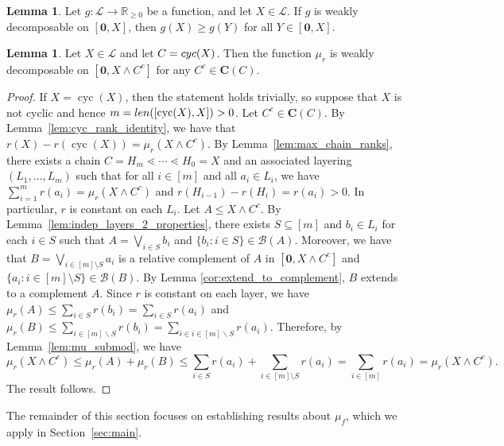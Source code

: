 \documentclass[a4paper,11pt,reqno]{article}
\theoremstyle{definition}
\newtheorem{lemma}[theorem]{{{Lemma}}}
\newcommand{\len}{\textup{len}}
\newcommand{\zero}{{\mathbf{0}}}
\DeclareMathOperator{\cyc}{cyc}
\begin{document}
\begin{lemma}\label{lem:qmBA}
    Let $g:\mathcal{L}\to\mathbb{R}_{\geq 0}$ be a function, and let $X \in \mathcal{L}$.  
    If $g$ is weakly decomposable on $[\zero,X]$, then $g(X) \geq g(Y)$ for all $Y \in [\zero,X]$.  
\end{lemma}

\begin{lemma}\label{lem:mu_is_q-mod_on_cf}
    Let $X \in \mathcal{L}$ and let $C = \textup{cyc}(X)$. 
    Then the function $\mu_r$ is weakly decomposable on $[\zero, X\wedge C^c]$ for any $C^c \in \mathbf{C}(C)$.
\end{lemma}

\begin{proof}
    If $X=\cyc(X)$, then the statement holds trivially, so suppose that $X$ is not cyclic and hence $m=\len([\cyc(X),X])>0$. 
    Let $C^c\in\mathbf{C}(C)$. By Lemma~\ref{lem:cyc_rank_identity}, we have that
        $r(X)-r(\cyc(X))=\mu_r(X\wedge C^c).$
    By Lemma~\ref{lem:max_chain_ranks}, there exists a chain $C=H_m\lessdot\cdots\lessdot H_0=X$ and an associated layering 
    $(L_1,\dots,L_m)$ such that for all $i\in[m]$ and all $a_i\in L_i$, we have 
    $\sum_{i=1}^mr(a_i) = \mu_r(X\wedge C^c)$ and $r(H_{i-1})-r(H_i)=r(a_i)>0$.
    In particular, $r$ is constant on each $L_i$. 
    Let $A\leq X\wedge C^c$. By Lemma~\ref{lem:indep_layers_2_properties}, there exists $S\subseteq[m]$ and $b_i\in L_i$ for each $i\in S$ such that $A=\bigvee_{i\in S}b_i$ and $\{b_i:i\in S\}\in\mathcal{B}(A)$. Moreover, we have that $B=\bigvee_{i\in[m]\setminus S}a_i$ is a relative complement of $A$ in $[\zero,X\wedge C^c]$ and $\{a_i:i\in [m]\setminus S\}\in\mathcal{B}(B)$. By Lemma \ref{cor:extend_to_complement}, $B$ extends to a complement $A$. Since $r$ is constant on each layer, we have $\mu_r(A) \leq \sum_{i\in S}r(b_i)=\sum_{i\in S}r(a_i)$ and 
    $\mu_r(B)\leq \sum_{i\in [m] \backslash S}r(b_i)=\sum_{i\in i\in [m] \backslash S}r(a_i)$. Therefore, by Lemma~\ref{lem:mu_submod}, we have
    $$\mu_r(X\wedge C^c)\leq\mu_r(A)+\mu_r(B)\leq\sum_{i\in S}r(a_i)+\sum_{i\in[m]\setminus S}r(a_i)=\sum_{i\in[m]}r(a_i)=\mu_r(X\wedge C^c).$$
    The result follows.
    \end{proof}


The remainder of this section focuses on establishing results about $\mu_f$, which we apply in Section~\ref{sec:main}.
\end{document}
